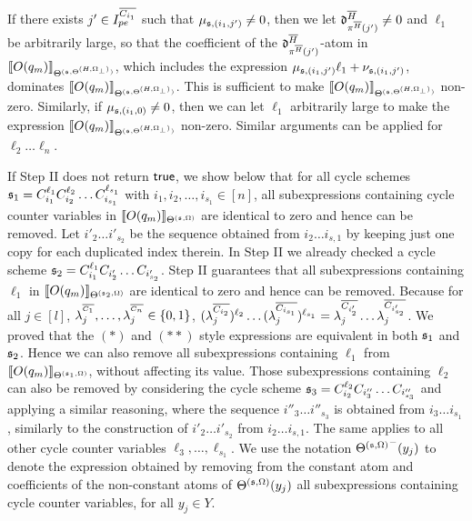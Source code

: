 If there exists $j' \in I^{\overline{C_{i_1}}}_{pe}$ such that $\mu_{{\mathfrak{s} },(i_1,j')} \neq 0$, then we let $\mathfrak{d}^{\overline{H}}_{\pi^{\overline{H}}(j')} \neq 0$ and $\ell_1$ be arbitrarily large, so that the coefficient of the  $\mathfrak{d}^{\overline{H}}_{\pi^{\overline{H}}(j')}$-atom in $\llbracket O(q_m)\rrbracket_{\Theta^{({\mathfrak{s} },\Theta^{(H,\Omega_\bot)})}}$, which includes the expression $\mu_{{\mathfrak{s} }, (i_1,j')} \ell_1 + \nu_{{\mathfrak{s} }, (i_1,j')}$, dominates $\llbracket O(q_m)\rrbracket_{\Theta^{({\mathfrak{s} },\Theta^{(H,\Omega_\bot)})}}$. This is sufficient to make $\llbracket O(q_m)\rrbracket_{\Theta^{({\mathfrak{s} },\Theta^{(H,\Omega_\bot)})}}$ non-zero. Similarly, if $\mu_{{\mathfrak{s} },(i_1,0)} \neq 0$, then we can let $\ell_1$ arbitrarily large to make the expression $\llbracket O(q_m)\rrbracket_{\Theta^{({\mathfrak{s} },\Theta^{(H,\Omega_\bot)})}}$ non-zero.
Similar arguments can be applied for $\ell_2\dots\ell_n$.

If Step II does not return $\mathsf{true}$, we show below that for all cycle schemes ${\mathfrak{s} }_1=C_{i_1}^{\ell_1} C_{i_2}^{\ell_2} \dots C_{i_{s_1}}^{\ell_{s_1}}$ with $i_1,i_2,\dots,i_{s_1} \in [n]$, all subexpressions containing cycle counter variables in $\llbracket O(q_m)\rrbracket_{\Theta^{({\mathfrak{s} },\Omega)}}$ are identical to zero and hence can be removed. Let ${i'_2} \dots {i'_{s_2}}$ be the sequence obtained from $i_2 \dots i_{s,1}$ by keeping just one copy for each duplicated index therein.  
In Step II we already checked a cycle scheme ${\mathfrak{s} }_2=C_{i_1}^{\ell_1} C_{i'_2} \dots C_{i'_{s_2}}$. Step II guarantees that all subexpressions containing $\ell_1$ in 
$\llbracket O(q_m)\rrbracket_{\Theta^{({\mathfrak{s} }_2,\Omega)}}$ are identical to zero and hence can be removed.
Because for all $j\in[l]$, $\lambda^{^{\overline{C_1}}}_j, \dots, \lambda^{^{\overline{C_n}}}_j \in \{0,1\}$,   $(\lambda^{\overline{C_{i_2}}}_{j})^{\ell_2} \dots (\lambda^{\overline{C_{i_{s_1}}}}_{j})^{\ell_{s_1}} = \lambda^{\overline{C_{i'_2}}}_{j} \dots \lambda^{\overline{C_{i'_{s_2}}}}_{j}$. We proved that the $(\ast)$ and $(\ast\ast)$ style expressions are equivalent in both ${\mathfrak{s} }_1$ and ${\mathfrak{s} }_2$.
Hence we can also remove all subexpressions containing $\ell_1$ from  $\llbracket O(q_m)\rrbracket_{\Theta^{({\mathfrak{s} }_1,\Omega)}}$, without affecting its value.
Those subexpressions containing $\ell_2$ can also be removed by considering the cycle scheme ${\mathfrak{s} }_3=C_{i_2}^{\ell_2} C_{i''_3} \dots C_{i''_{s_3}}$ and applying a similar reasoning, where the sequence ${i''_3} \dots {i''_{s_3}}$ is obtained from ${i_3} \dots  i_{s_1}$, similarly to the construction of ${i'_2} \dots {i'_{s_2}}$ from $i_2 \dots i_{s,1}$. The same applies to all other cycle counter variables $\ell_3,\dots,\ell_{s_1}$.
We use the notation ${\Theta^{({\mathfrak{s} },\Omega)}}^-(y_j)$ to denote the expression obtained by removing from the constant atom and coefficients of the non-constant atoms of $\Theta^{({\mathfrak{s} },\Omega)}(y_j)$ all subexpressions containing cycle counter variables, for all $y_j \in Y$. 

